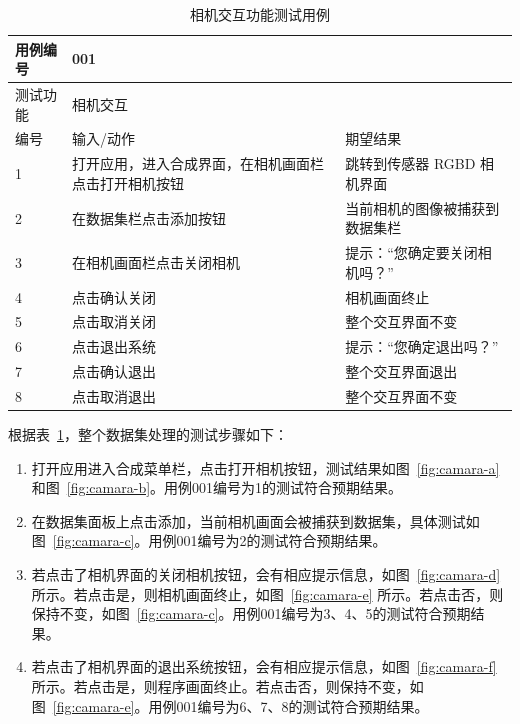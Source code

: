 \begin{table}[thbp]
  \centering
  \small{}\setlength{}
  \caption{相机交互功能测试用例}
  \begin{tabular}{|p{2cm}<{\centering}|p{4cm}<{\centering}|p{4cm}<{\centering}|}
    \hline
    用例编号 & \multicolumn{2}{|l|}{001}       \\
    \hline
    测试功能 & \multicolumn{2}{|l|}{相机交互}       \\
    \hline
    编号 & 输入/动作 & 期望结果 \\
    \hline
    1 & 打开应用，进入合成界面，在相机画面栏点击打开相机按钮 & 跳转到传感器 RGBD 相机界面 \\
    \hline
    2 & 在数据集栏点击添加按钮 & 当前相机的图像被捕获到数据集栏 \\
    \hline
    3 & 在相机画面栏点击关闭相机 & 提示：“您确定要关闭相机吗？” \\
    \hline
    4 & 点击确认关闭 & 相机画面终止 \\
    \hline
    5 & 点击取消关闭 & 整个交互界面不变 \\
    \hline
    6 & 点击退出系统 & 提示：“您确定退出吗？” \\
    \hline
    7 & 点击确认退出 & 整个交互界面退出 \\
    \hline
    8 & 点击取消退出 & 整个交互界面不变 \\
    \hline
  \end{tabular}
  \label{tab:camera}
\end{table}
根据表~\ref{tab:camera}，整个数据集处理的测试步骤如下：
\begin{enumerate}
    \item[1)] 打开应用进入合成菜单栏，点击打开相机按钮，测试结果如图~\ref{fig:camara-a} 和图~\ref{fig:camara-b}。用例001编号为1的测试符合预期结果。
    \item[2)] 在数据集面板上点击添加，当前相机画面会被捕获到数据集，具体测试如图~\ref{fig:camara-c}。用例001编号为2的测试符合预期结果。
    \item[3)] 若点击了相机界面的关闭相机按钮，会有相应提示信息，如图~\ref{fig:camara-d} 所示。若点击是，则相机画面终止，如图~\ref{fig:camara-e} 所示。若点击否，则保持不变，如图~\ref{fig:camara-c}。用例001编号为3、4、5的测试符合预期结果。
    \item[4)] 若点击了相机界面的退出系统按钮，会有相应提示信息，如图~\ref{fig:camara-f} 所示。若点击是，则程序画面终止。若点击否，则保持不变，如图~\ref{fig:camara-e}。用例001编号为6、7、8的测试符合预期结果。
\end{enumerate}

